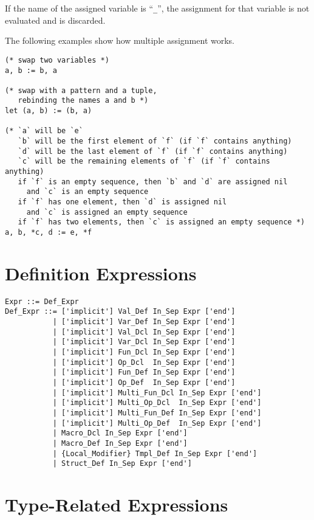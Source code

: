 If the name of the assigned variable is ``\lstinline!_!'', the assignment for that variable is not evaluated and is discarded. 

\example The following examples show how multiple assignment works. 
\begin{lstlisting}
(* swap two variables *)
a, b := b, a

(* swap with a pattern and a tuple, 
   rebinding the names a and b *)
let (a, b) := (b, a)

(* `a` will be `e`
   `b` will be the first element of `f` (if `f` contains anything)
   `d` will be the last element of `f` (if `f` contains anything)
   `c` will be the remaining elements of `f` (if `f` contains anything)
   if `f` is an empty sequence, then `b` and `d` are assigned nil
     and `c` is an empty sequence
   if `f` has one element, then `d` is assigned nil 
     and `c` is assigned an empty sequence
   if `f` has two elements, then `c` is assigned an empty sequence *)
a, b, *c, d := e, *f
\end{lstlisting}





\section{Definition Expressions}
\label{sec:def-expressions}

\syntax\begin{lstlisting}
Expr ::= Def_Expr
Def_Expr ::= ['implicit'] Val_Def In_Sep Expr ['end']
           | ['implicit'] Var_Def In_Sep Expr ['end']
           | ['implicit'] Val_Dcl In_Sep Expr ['end']
           | ['implicit'] Var_Dcl In_Sep Expr ['end']
           | ['implicit'] Fun_Dcl In_Sep Expr ['end']
           | ['implicit'] Op_Dcl  In_Sep Expr ['end']
           | ['implicit'] Fun_Def In_Sep Expr ['end']
           | ['implicit'] Op_Def  In_Sep Expr ['end']
           | ['implicit'] Multi_Fun_Dcl In_Sep Expr ['end']
           | ['implicit'] Multi_Op_Dcl  In_Sep Expr ['end']
           | ['implicit'] Multi_Fun_Def In_Sep Expr ['end']
           | ['implicit'] Multi_Op_Def  In_Sep Expr ['end']
           | Macro_Dcl In_Sep Expr ['end']
           | Macro_Def In_Sep Expr ['end']
           | {Local_Modifier} Tmpl_Def In_Sep Expr ['end']
           | Struct_Def In_Sep Expr ['end']
\end{lstlisting}




\section{Type-Related Expressions}





